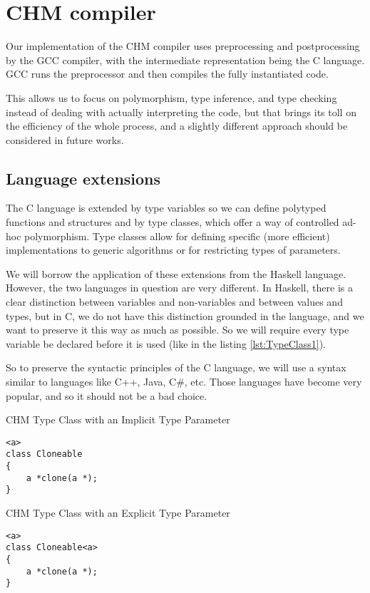 \chapter{CHM compiler}
\label{chap:compilerCHM}

Our implementation of the CHM compiler uses preprocessing and postprocessing by the GCC compiler, with the intermediate representation being the C language. GCC runs the preprocessor and then compiles the fully instantiated code.

This allows us to focus on polymorphism, type inference, and type checking instead of dealing with actually interpreting the code, but that brings its toll on the efficiency of the whole process, and a slightly different approach should be considered in future works.

\section{Language extensions}

The C language is extended by type variables so we can define polytyped functions and structures and by type classes, which offer a way of controlled ad-hoc polymorphism. Type classes allow for defining specific (more efficient) implementations to generic algorithms or for restricting types of parameters.

We will borrow the application of these extensions from the Haskell language. However, the two languages in question are very different. In Haskell, there is a clear distinction between variables and non-variables and between values and types, but in C, we do not have this distinction grounded in the language, and we want to preserve it this way as much as possible. So we will require every type variable be declared before it is used (like in the listing \ref{lst:TypeClass1}).

So to preserve the syntactic principles of the C language, we will use a syntax similar to languages like C++, Java, C\#, etc. Those languages have become very popular, and so it should not be a bad choice.

\begin{listing}
\caption{CHM Type Class with an Implicit Type Parameter}
\label{lst:TypeClass1}
\begin{lstlisting}
<a>
class Cloneable
{
    a *clone(a *);
}
\end{lstlisting}
\end{listing}

\begin{listing}
\caption{CHM Type Class with an Explicit Type Parameter}
\label{lst:TypeClass2}
\begin{lstlisting}
<a>
class Cloneable<a>
{
    a *clone(a *);
}
\end{lstlisting}
\end{listing}

